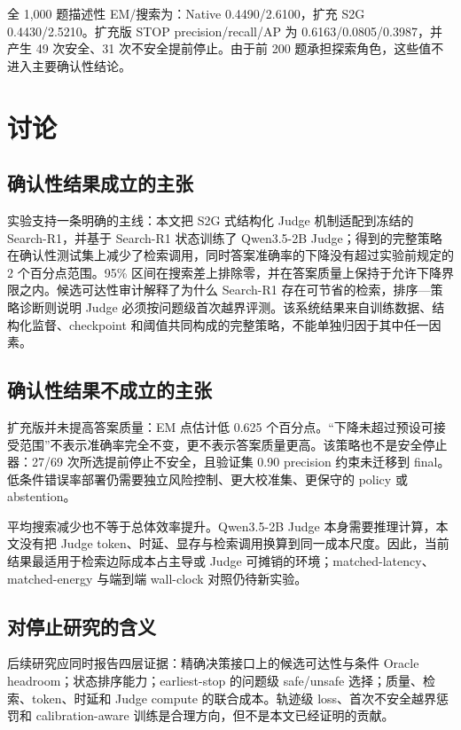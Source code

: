 \documentclass[UTF8,fontset=fandol,11pt,a4paper]{ctexart}
\begin{document}
全 1,000 题描述性 EM/搜索为：Native 0.4490/2.6100，扩充 S2G 0.4430/2.5210。扩充版 STOP precision/recall/AP 为 0.6163/0.0805/0.3987，并产生 49 次安全、31 次不安全提前停止。由于前 200 题承担探索角色，这些值不进入主要确认性结论。

\section{讨论}

\subsection{确认性结果成立的主张}

实验支持一条明确的主线：本文把 S2G 式结构化 Judge 机制适配到冻结的 Search-R1，并基于 Search-R1 状态训练了 Qwen3.5-2B Judge；得到的完整策略在确认性测试集上减少了检索调用，同时答案准确率的下降没有超过实验前规定的 2 个百分点范围。95\% 区间在搜索差上排除零，并在答案质量上保持于允许下降界限之内。候选可达性审计解释了为什么 Search-R1 存在可节省的检索，排序—策略诊断则说明 Judge 必须按问题级首次越界评测。该系统结果来自训练数据、结构化监督、checkpoint 和阈值共同构成的完整策略，不能单独归因于其中任一因素。

\subsection{确认性结果不成立的主张}

扩充版并未提高答案质量：EM 点估计低 0.625 个百分点。“下降未超过预设可接受范围”不表示准确率完全不变，更不表示答案质量更高。该策略也不是安全停止器：27/69 次所选提前停止不安全，且验证集 0.90 precision 约束未迁移到 final。低条件错误率部署仍需要独立风险控制、更大校准集、更保守的 policy 或 abstention。

平均搜索减少也不等于总体效率提升。Qwen3.5-2B Judge 本身需要推理计算，本文没有把 Judge token、时延、显存与检索调用换算到同一成本尺度。因此，当前结果最适用于检索边际成本占主导或 Judge 可摊销的环境；matched-latency、matched-energy 与端到端 wall-clock 对照仍待新实验。

\subsection{对停止研究的含义}

后续研究应同时报告四层证据：精确决策接口上的候选可达性与条件 Oracle headroom；状态排序能力；earliest-stop 的问题级 safe/unsafe 选择；质量、检索、token、时延和 Judge compute 的联合成本。轨迹级 loss、首次不安全越界惩罚和 calibration-aware 训练是合理方向，但不是本文已经证明的贡献。
\end{document}
